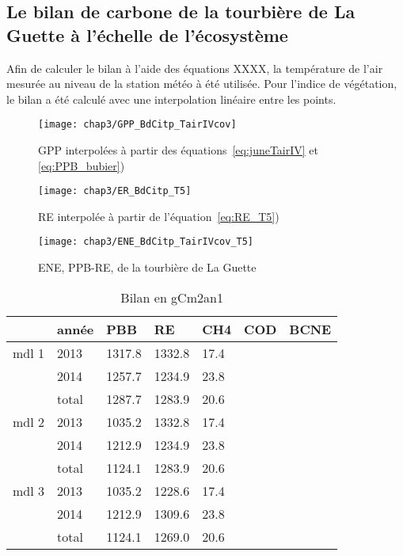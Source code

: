 \subsection{Le bilan de carbone de la tourbière de La Guette à l'échelle de l'écosystème}


Afin de calculer le bilan à l'aide des équations XXXX, la température de l'air mesurée au niveau de la station météo à été utilisée.
Pour l'indice de végétation, le bilan a été calculé avec une interpolation linéaire entre les points.

\begin{figure}
\centering
\texttt{[image: chap3/GPP\_BdCitp\_TairIVcov]}
\caption{GPP interpolées à partir des équations~\ref{eq:juneTairIV} et \ref{eq:PPB_bubier})}
\label{fig:ENE_BdC_TairIVcov-T5}
\end{figure}

\begin{figure}
\centering
\texttt{[image: chap3/ER\_BdCitp\_T5]}
\caption{RE interpolée à partir de l'équation~\ref{eq:RE_T5})}
\label{fig:RE_BdC_T5}
\end{figure}

\begin{figure}
\centering
\texttt{[image: chap3/ENE\_BdCitp\_TairIVcov\_T5]}
\caption{ENE, PPB-RE, de la tourbière de La Guette}
\label{fig:PPB_BdC_TairIVcov}
\end{figure}


\begin{table}
\centering
\caption{Bilan en gCm2an1}
\label{table:mdl_sensitiv}
\begin{tabular}{lllllll}\toprule
& année & PBB & RE & CH4 & COD & BCNE \\ \midrule
mdl 1 & 2013 & 1317.8 & 1332.8 & 17.4 & & \\[+.5ex]
& 2014 & 1257.7 & 1234.9 & 23.8 & & \\ [+1ex]
& total & 1287.7 & 1283.9 & 20.6 & &\\[+2ex]
mdl 2 & 2013 & 1035.2 & 1332.8 & 17.4 & & \\[+.5ex]
& 2014 & 1212.9 & 1234.9 & 23.8 &  & \\ [+1ex]
& total & 1124.1 & 1283.9 & 20.6 & &\\[+2ex]
mdl 3 & 2013 & 1035.2 & 1228.6 & 17.4 & & \\[+.5ex]
& 2014 & 1212.9 & 1309.6 & 23.8 & & \\ [+1ex]
& total & 1124.1 & 1269.0 & 20.6 & &\\[+1ex]
\bottomrule
\end{tabular}
\end{table}


